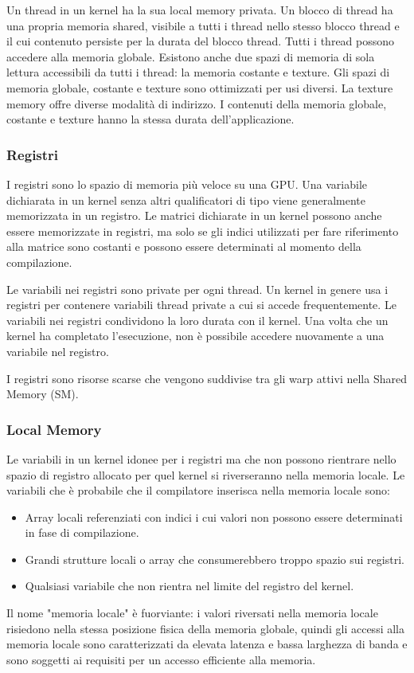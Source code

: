Un thread in un kernel ha la sua local memory privata. Un blocco di thread ha una propria memoria shared, visibile a tutti i thread nello stesso blocco thread e il cui contenuto persiste per la durata del blocco thread. Tutti i thread possono accedere alla memoria globale. Esistono anche due spazi di memoria di sola lettura accessibili da tutti i thread: la memoria costante e texture. Gli spazi di memoria globale, costante e texture sono ottimizzati per usi diversi. La texture memory offre diverse modalità di indirizzo. I contenuti della memoria globale, costante e texture hanno la stessa durata dell'applicazione.
\subsubsection{Registri}
I registri sono lo spazio di memoria più veloce su una GPU. Una variabile dichiarata in un kernel senza altri qualificatori di tipo viene generalmente memorizzata in un registro. Le matrici dichiarate in un kernel possono anche essere memorizzate in registri, ma solo se gli indici utilizzati per fare riferimento alla matrice sono costanti e possono essere determinati al momento della compilazione.

Le variabili nei registri sono private per ogni thread. Un kernel in genere usa i registri per contenere variabili thread private a cui si accede frequentemente. Le variabili nei registri condividono la loro durata con il kernel. Una volta che un kernel ha completato l'esecuzione, non è possibile accedere nuovamente a una variabile nel registro.

I registri sono risorse scarse che vengono suddivise tra gli warp attivi nella Shared Memory (SM).

\subsubsection{Local Memory}
Le variabili in un kernel idonee per i registri ma che non possono rientrare nello spazio di registro allocato per quel kernel si riverseranno nella memoria locale. Le variabili che è probabile che il compilatore inserisca nella memoria locale sono:
\begin{itemize}
	\item Array locali referenziati con indici i cui valori non possono essere determinati in fase di compilazione.
	\item Grandi strutture locali o array che consumerebbero troppo spazio sui registri.
	\item Qualsiasi variabile che non rientra nel limite del registro del kernel.
\end{itemize}
Il nome "memoria locale" è fuorviante: i valori riversati nella memoria locale risiedono nella stessa posizione fisica della memoria globale, quindi gli accessi alla memoria locale sono caratterizzati da elevata latenza e bassa larghezza di banda e sono soggetti ai requisiti per un accesso efficiente alla memoria.

